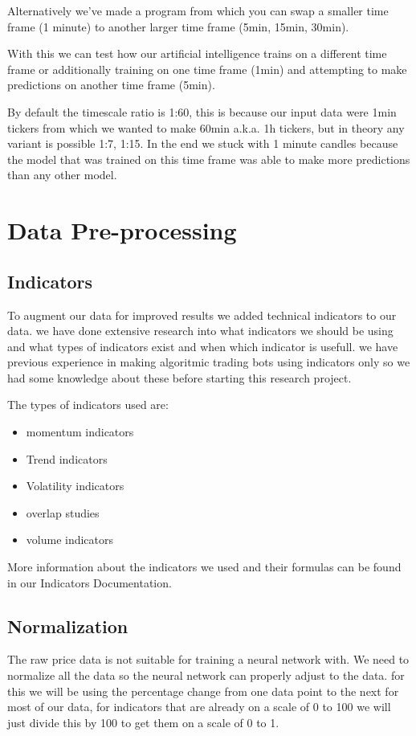 \documentclass[12pt,a4paper]{article}
\begin{document}
Alternatively we've made a program from which you can swap a smaller time frame (1 minute) to another larger time frame (5min, 15min, 30min).

With this we can test how our artificial intelligence trains on a different time frame or additionally training on one time frame (1min) and attempting to make predictions on another time frame (5min).

By default the timescale ratio is 1:60, this is because our input data were 1min tickers from which we wanted to make 60min a.k.a. 1h tickers, but in theory any variant is possible 1:7, 1:15.
In the end we stuck with 1 minute candles because the model that was trained on this time frame was able to make more predictions than any other model.

\section{Data Pre-processing}

\subsection{Indicators}

To augment our data for improved results we added technical indicators to our data. we have done extensive research into what indicators we should be using and what types of indicators exist and when which indicator is usefull. we have previous experience in making algoritmic trading bots using indicators only so we had some knowledge about these before starting this research project.

The types of indicators used are: 
\begin{itemize}
    \item momentum indicators
    \item Trend indicators
    \item Volatility indicators
    \item overlap studies
    \item volume indicators
\end{itemize}
More information about the indicators we used and their formulas can be found in our Indicators Documentation.

\subsection{Normalization}

The raw price data is not suitable for training a neural network with. We need to normalize all the data so the neural network can properly adjust to the data. for this we will be using the percentage change from one data point to the next for most of our data, for indicators that are already on a scale of 0 to 100 we will just divide this by 100 to get them on a scale of 0 to 1.
\end{document}
